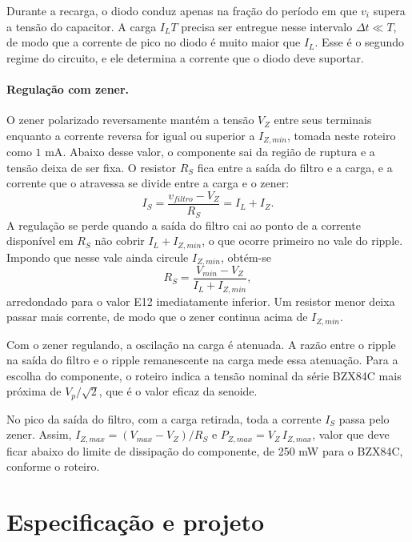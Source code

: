 \documentclass[11pt,a4paper]{article}
\begin{document}
Durante a recarga, o diodo conduz apenas na fração do período em que $v_i$ supera a tensão do capacitor. A carga $I_L T$ precisa ser entregue nesse intervalo $\Delta t \ll T$, de modo que a corrente de pico no diodo é muito maior que $I_L$. Esse é o segundo regime do circuito, e ele determina a corrente que o diodo deve suportar.

\paragraph{Regulação com zener.} O zener polarizado reversamente mantém a tensão $V_Z$ entre seus terminais enquanto a corrente reversa for igual ou superior a $I_{Z,min}$, tomada neste roteiro como $1\text{ mA}$. Abaixo desse valor, o componente sai da região de ruptura e a tensão deixa de ser fixa. O resistor $R_S$ fica entre a saída do filtro e a carga, e a corrente que o atravessa se divide entre a carga e o zener:
\[
I_S = \frac{v_{filtro} - V_Z}{R_S} = I_L + I_Z.
\]
A regulação se perde quando a saída do filtro cai ao ponto de a corrente disponível em $R_S$ não cobrir $I_L + I_{Z,min}$, o que ocorre primeiro no vale do ripple. Impondo que nesse vale ainda circule $I_{Z,min}$, obtém-se
\begin{equation}
R_S = \frac{V_{min} - V_Z}{I_L + I_{Z,min}},
\label{eq:rs}
\end{equation}
arredondado para o valor E12 imediatamente inferior. Um resistor menor deixa passar mais corrente, de modo que o zener continua acima de $I_{Z,min}$.

Com o zener regulando, a oscilação na carga é atenuada. A razão entre o ripple na saída do filtro e o ripple remanescente na carga mede essa atenuação. Para a escolha do componente, o roteiro indica a tensão nominal da série BZX84C mais próxima de $V_p/\sqrt{2}$, que é o valor eficaz da senoide.

No pico da saída do filtro, com a carga retirada, toda a corrente $I_S$ passa pelo zener. Assim, $I_{Z,max} = (V_{max} - V_Z)/R_S$ e $P_{Z,max} = V_Z\, I_{Z,max}$, valor que deve ficar abaixo do limite de dissipação do componente, de 250 mW para o BZX84C, conforme o roteiro.

\section{Especificação e projeto}
\end{document}
